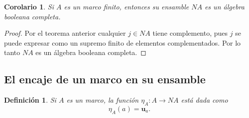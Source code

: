\documentclass[12pt,letterpaper,titlepage]{article}
\newtheorem*{defn}{Definición}
\newtheorem*{cor}{Corolario}
\theoremstyle{definition}
\newcommand\unuc[1]{\mathbf u_{#1}}
\newcommand\<{\langle}
\renewcommand\>{\rangle}
\begin{document}
\begin{cor}
  Si $A$ es un marco finito, entonces su ensamble $NA$ es un
  álgebra booleana completa.
\end{cor}
\begin{proof}
Por el teorema anterior cualquier $j\in NA$ tiene complemento, pues $j$ se puede expresar como un supremo finito de elementos complementados. Por lo tanto $NA$ es un álgebra booleana completa.
\end{proof}

\subsection{El encaje de un marco en su ensamble}

\begin{defn}
  Si $A$ es un marco, la función $\eta_A:A\to NA$ está dada como
  \[
    \eta_A(a) = \unuc a
  .\]
\end{defn}
\end{document}
